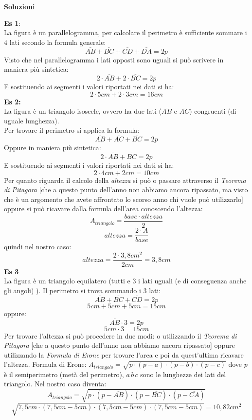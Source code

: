 \documentclass[14pt]{extarticle}
\begin{document}
\newpage
\begin{center}\textbf{Soluzioni}\\\end{center}
\textbf{Es 1}:\\
La figura è un parallelogramma, per calcolare il perimetro è sufficiente sommare i 4 lati secondo la formula generale:
$$\overline{AB}+\overline{BC}+\overline{CD}+\overline{DA}=2p$$
Visto che nel parallelogramma i lati opposti sono uguali si può scrivere in maniera più sintetica:
$$2\cdot\overline{AB}+2\cdot\overline{BC}=2p$$
E sostituendo ai segmenti i valori riportati nei dati si ha: $$2\cdot5cm+2\cdot3cm=16cm$$
\textbf{Es 2:}\\
La figura è un triangolo isoscele, ovvero ha due lati (\(\overline{AB}\) e \(\overline{AC}\)) congruenti (di uguale lunghezza).\\
Per trovare il perimetro si applica la formula:
$$\overline{AB}+\overline{AC}+\overline{BC}=2p$$
Oppure in maniera più sintetica:
$$2\cdot\overline{AB}+\overline{BC}=2p$$
E sostituendo ai segmenti i valori riportati nei dati si ha: $$ 2\cdot4cm +2cm=10cm$$
Per quanto riguarda il calcolo della \textit{altezza} si può o passare attraverso il \textit{Teorema di Pitagora} [che a questo punto dell'anno non abbiamo ancora ripassato, ma visto che è un argomento che avete affrontato lo scorso anno chi vuole può utilizzarlo] oppure si può ricavare dalla formula dell'area conoscendo l'altezza:
$$A_{triangolo}=\frac{base\cdot altezza}{2}$$
$$altezza=\frac{2\cdot A}{base}$$
quindi nel nostro caso:
$$altezza=\frac{2\cdot 3,8cm^2}{2cm}=3,8cm$$
\textbf{Es 3}\\
La figura è un triangolo equilatero (tutti e 3 i lati uguali (e di conseguenza anche gli angoli) ). Il perimetro si trova sommando i 3 lati:\\ $$\overline{AB}+\overline{BC}+\overline{CD}=2p$$
$$5cm+5cm+5cm=15cm$$
oppure:
$$\overline{AB}\cdot3=2p$$
$$5cm\cdot3=15cm$$
Per trovare l'altezza si può procedere in due modi: o utilizzando il \textit{Teorema di Pitagora} [che a questo punto dell'anno non abbiamo ancora ripassato] oppure utilizzando la \textit{Formula di Erone} per trovare l'area e poi da quest'ultima ricavare l'altezza.
Formula di Erone: $A_{triangolo}=\sqrt{p\cdot(p-a)\cdot (p-b)\cdot(p-c)}$ dove $p$ è il semiperimetro (metà del perimetro), $a\,b\,c$ sono le lunghezze dei lati del triangolo. Nel nostro caso diventa:
$$A_{triangolo}=\sqrt{p\cdot(p-\overline{AB})\cdot(p-\overline{BC})\cdot(p-\overline{CA})}$$
$$\sqrt{7,5cm\cdot(7,5cm-5cm)\cdot(7,5cm-5cm)\cdot(7,5cm -5cm)}=10,82cm^2$$
\end{document}
